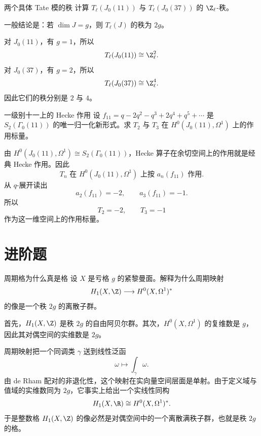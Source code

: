 \begin{problem}{两个具体 Tate 模的秩}
\easy
计算 $T_\ell(J_0(11))$ 与 $T_\ell(J_0(37))$ 的 $\Z_\ell$-秩。
\end{problem}
\begin{solution}
一般结论是：若 $\dim J=g$，则 $T_\ell(J)$ 的秩为 $2g$。

对 $J_0(11)$，有 $g=1$，所以
\[
T_\ell(J_0(11))\cong \Z_\ell^2.
\]
对 $J_0(37)$，有 $g=2$，所以
\[
T_\ell(J_0(37))\cong \Z_\ell^4.
\]
因此它们的秩分别是 $2$ 与 $4$。
\end{solution}

\begin{problem}{一级别十一上的 Hecke 作用}
\easy
设 $f_{11}=q-2q^2-q^3+2q^4+q^5+\cdots$ 是 $S_2(\Gamma_0(11))$ 的唯一归一化新形式。求 $T_2$ 与 $T_3$ 在 $H^0(J_0(11),\Omega^1)$ 上的作用标量。
\end{problem}
\begin{solution}
由 $H^0(J_0(11),\Omega^1)\cong S_2(\Gamma_0(11))$，Hecke 算子在余切空间上的作用就是经典 Hecke 作用。因此
\[
T_n\text{ 在 }H^0(J_0(11),\Omega^1)\text{ 上按 }a_n(f_{11})\text{ 作用}.
\]
从 $q$-展开读出
\[
a_2(f_{11})=-2,
\qquad
 a_3(f_{11})=-1.
\]
所以
\[
T_2=-2,
\qquad
T_3=-1
\]
作为这一维空间上的作用标量。
\end{solution}

\section{进阶题 \medium}

\begin{problem}{周期格为什么真是格}
\medium
设 $X$ 是亏格 $g$ 的紧黎曼面。解释为什么周期映射
\[
H_1(X,\Z)\longrightarrow H^0(X,\Omega^1)^*
\]
的像是一个秩 $2g$ 的离散子群。
\end{problem}
\begin{solution}
首先，$H_1(X,\Z)$ 是秩 $2g$ 的自由阿贝尔群。其次，$H^0(X,\Omega^1)$ 的复维数是 $g$，因此其对偶空间的实维数是 $2g$。

周期映射把一个同调类 $\gamma$ 送到线性泛函
\[
\omega\longmapsto \int_\gamma \omega.
\]
由 de Rham 配对的非退化性，这个映射在实向量空间层面是单射。由于定义域与值域的实维数同为 $2g$，它事实上给出一个实线性同构
\[
H_1(X,\R)\cong H^0(X,\Omega^1)^*.
\]
于是整数格 $H_1(X,\Z)$ 的像必然是对偶空间中的一个离散满秩子群，也就是秩 $2g$ 的格。
\end{solution}

